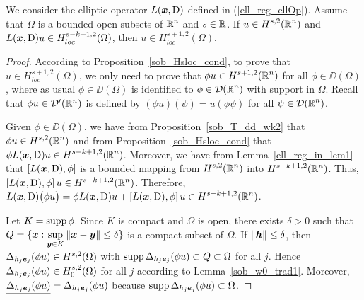 \begin{lemma} \label{ell_reg_in_lem2}
We consider the elliptic operator $L({\bm{x}},\operatorname{D})$ defined in
(\ref{ell_reg_ellOp}).  Assume that $\Omega$ is a bounded open subsets of
$\displaystyle \mathbb{R}^n$ and $s\in \mathbb{R}$.  If $\displaystyle u\in H^{s,2}(\mathbb{R}^n)$
and $\displaystyle L({\bm{x}},\operatorname{D}) u \in H^{s-k+1,2}_{loc}(\Omega)$, then
$\displaystyle u \in H^{s+1,2}_{loc}(\Omega)$.
\end{lemma}

\begin{proof}
According to Proposition~\ref{sob_Hsloc_cond}, to prove that
$\displaystyle u \in H^{s+1,2}_{loc}(\Omega)$, we only need to prove that
$\displaystyle \phi u \in H^{s+1,2}(\mathbb{R}^n)$ for all $\phi\in \DD(\Omega)$,
where as usual $\phi \in \DD(\Omega)$ is identified to
$\displaystyle \phi \in \mathcal{D}(\mathbb{R}^n)$ with
support in $\Omega$.  Recall that $\phi  u \in \mathcal{D}'(\mathbb{R}^n)$ is
defined by $(\phi u)(\psi) = u(\phi \psi)$ for all
$\displaystyle \psi \in \mathcal{D}(\mathbb{R}^n)$.

Given $\phi \in \DD(\Omega)$, we have from
Proposition~\ref{sob_T_dd_wk2} that $\displaystyle \phi u \in H^{s,2}(\mathbb{R}^n)$
and from Proposition~\ref{sob_Hsloc_cond} that
$\displaystyle \phi L({\bm{x}},\operatorname{D}) u \in H^{s-k+1,2}(\mathbb{R}^n)$.
Moreover, we have from Lemma~\ref{ell_reg_in_lem1}
that $\left[ L({\bm{x}},\operatorname{D}), \phi\right]$ is a bounded mapping from
$\displaystyle H^{s,2}(\mathbb{R}^n)$ into $\displaystyle H^{s-k+1,2}(\mathbb{R}^n)$.
Thus,
$\displaystyle \left[ L({\bm{x}},\operatorname{D}), \phi\right]u \in H^{s-k+1,2}(\mathbb{R}^n)$.
Therefore,
$\displaystyle L({\bm{x}},\operatorname{D}) \big(\phi u\big) = \phi L({\bm{x}}, \operatorname{D}) u +
\left[ L({\bm{x}},\operatorname{D}), \phi\right] u \in H^{s-k+1,2}(\mathbb{R}^n)$.

Let $K = \operatorname{supp} \phi$.  Since $K$ is compact and $\Omega$ is open, there
exists $\delta >0$ such that
$\displaystyle Q = \{ {\bm{x}} :
\sup_{{\bm{y}} \in K} \|{\bm{x}} -{\bm{y}}\|\leq \delta \}$
is a compact subset of $\Omega$.  If $\|{\bm{h}}\| \leq \delta$, then
$\Delta_{h_j{\bm{e}}_j} (\phi u) \in H^{s,2}(\Omega)$
with $\operatorname{supp} \Delta_{h_j{\bm{e}}_j} (\phi u) \subset Q
\subset \Omega$ for all $j$.  Hence
$\Delta_{h_j{\bm{e}}_j} (\phi u) \in H^{s,2}_0(\Omega)$
for all $j$ according to Lemma~\ref{sob_w0_trad1}.  Moreover,
$\underline{\Delta_{h_j{\bm{e}}_j} (\phi u)}
= \Delta_{h_j{\bm{e}}_j} (\phi u)$ because
$\operatorname{supp} \Delta_{h_j{\bm{e}}_j} (\phi u)\subset \Omega$.


\end{proof}

